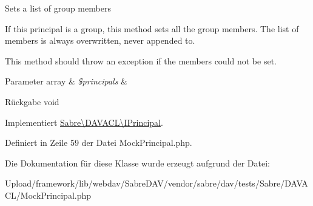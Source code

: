 Sets a list of group members

If this principal is a group, this method sets all the group members. The list of members is always overwritten, never appended to.

This method should throw an exception if the members could not be set.


\begin{DoxyParams}[1]{Parameter}
array & {\em \$principals} & \\
\hline
\end{DoxyParams}
\begin{DoxyReturn}{Rückgabe}
void 
\end{DoxyReturn}


Implementiert \mbox{\hyperlink{interface_sabre_1_1_d_a_v_a_c_l_1_1_i_principal_a9dfeb1ed9f70016333ef2b0ec1753677}{Sabre\textbackslash{}\+D\+A\+V\+A\+C\+L\textbackslash{}\+I\+Principal}}.



Definiert in Zeile 59 der Datei Mock\+Principal.\+php.



Die Dokumentation für diese Klasse wurde erzeugt aufgrund der Datei\+:\begin{DoxyCompactItemize}
\item 
Upload/framework/lib/webdav/\+Sabre\+D\+A\+V/vendor/sabre/dav/tests/\+Sabre/\+D\+A\+V\+A\+C\+L/Mock\+Principal.\+php\end{DoxyCompactItemize}
